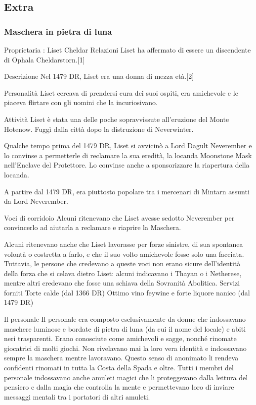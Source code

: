 \documentclass{article}
\begin{document}
\subsection{Extra}
\subsubsection{Maschera in pietra di luna}
Proprietaria : Liset Cheldar
Relazioni
Liset ha affermato di essere un discendente di Ophala Cheldarstorn.[1]

Descrizione\newline
Nel 1479 DR, Liset era una donna di mezza età.[2]

Personalità\newline
Liset cercava di prendersi cura dei suoi ospiti, era amichevole e le piaceva flirtare con gli uomini che la incuriosivano.

Attività\newline
Liset è stata una delle poche sopravvissute all'eruzione del Monte Hotenow. Fuggì dalla città dopo la distruzione di Neverwinter.

Qualche tempo prima del 1479 DR, Liset si avvicinò a Lord Dagult Neverember e lo convinse a permetterle di reclamare la sua eredità, la locanda Moonstone Mask nell'Enclave del Protettore. Lo convinse anche a sponsorizzare la riapertura della locanda.

A partire dal 1479 DR, era piuttosto popolare tra i mercenari di Mintarn assunti da Lord Neverember.

Voci di corridoio\newline
Alcuni ritenevano che Liset avesse sedotto Neverember per convincerlo ad aiutarla a reclamare e riaprire la Maschera.

Alcuni ritenevano anche che Liset lavorasse per forze sinistre, di sua spontanea volontà o costretta a farlo, e che il suo volto amichevole fosse solo una facciata. Tuttavia, le persone che credevano a queste voci non erano sicure dell'identità della forza che si celava dietro Liset: alcuni indicavano i Thayan o i Netherese, mentre altri credevano che fosse una schiava della Sovranità Abolitica.
\newline
Servizi forniti
Torte calde (dal 1366 DR)
Ottimo vino feywine e forte liquore nanico (dal 1479 DR)

Il personale\newline
Il personale era composto esclusivamente da donne che indossavano maschere luminose e bordate di pietra di luna (da cui il nome del locale) e abiti neri trasparenti. Erano conosciute come amichevoli e sagge, nonché rinomate giocatrici di molti giochi. Non rivelavano mai la loro vera identità e indossavano sempre la maschera mentre lavoravano. Questo senso di anonimato li rendeva confidenti rinomati in tutta la Costa della Spada e oltre. Tutti i membri del personale indossavano anche amuleti magici che li proteggevano dalla lettura del pensiero e dalla magia che controlla la mente e permettevano loro di inviare messaggi mentali tra i portatori di altri amuleti.
\end{document}
